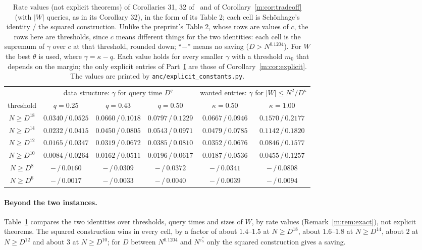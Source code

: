 \documentclass[11pt]{article}
\theoremstyle{definition}
\theoremstyle{remark}
\newcommand{\es}{\varepsilon^*_5}
\begin{document}
\begin{table}[t]
\centering\small
\setlength{\tabcolsep}{4pt}
\begin{tabular}{c|ccc|cc}
 & \multicolumn{3}{c|}{data structure: $\gamma$ for query time $D^{q}$} & \multicolumn{2}{c}{wanted entries: $\gamma$ for $|W|\le N^2/D^{\kappa}$}\\
threshold & $q=0.25$ & $q=0.43$ & $q=0.50$ & $\kappa=0.50$ & $\kappa=1.00$\\\hline
$N\ge D^{18}$ & $0.0340\,/\,0.0525$ & $0.0660\,/\,0.1018$ & $0.0797\,/\,0.1229$ & $0.0667\,/\,0.0946$ & $0.1570\,/\,0.2177$\\
$N\ge D^{14}$ & $0.0232\,/\,0.0415$ & $0.0450\,/\,0.0805$ & $0.0543\,/\,0.0971$ & $0.0479\,/\,0.0785$ & $0.1142\,/\,0.1820$\\
$N\ge D^{12}$ & $0.0165\,/\,0.0347$ & $0.0319\,/\,0.0672$ & $0.0385\,/\,0.0810$ & $0.0352\,/\,0.0676$ & $0.0846\,/\,0.1577$\\
$N\ge D^{10}$ & $0.0084\,/\,0.0264$ & $0.0162\,/\,0.0511$ & $0.0196\,/\,0.0617$ & $0.0187\,/\,0.0536$ & $0.0455\,/\,0.1257$\\
$N\ge D^{8}$ & $-\,/\,0.0160$ & $-\,/\,0.0309$ & $-\,/\,0.0372$ & $-\,/\,0.0341$ & $-\,/\,0.0808$\\
$N\ge D^{6}$ & $-\,/\,0.0017$ & $-\,/\,0.0033$ & $-\,/\,0.0040$ & $-\,/\,0.0039$ & $-\,/\,0.0094$
\end{tabular}
\caption{Rate values (not explicit theorems) of Corollaries 31, 32 of~\cite{ZT} and of Corollary~\ref{m:cor:tradeoff} (with $|W|$ queries, as in its Corollary 32), in the form of its Table 2; each cell is Schönhage's identity / the squared construction. Unlike the preprint's Table 2, whose rows are values of $c$, the rows here are thresholds, since $c$ means different things for the two identities: each cell is the supremum of $\gamma$ over $c$ at that threshold, rounded down; ``$-$'' means no saving ($D>N^{0.1204}$). For $W$ the best $\theta$ is used, where $\gamma=\kappa-q$. Each value holds for every smaller $\gamma$ with a threshold $m_0$ that depends on the margin; the only explicit entries of Part~\hyperref[m:partI]{I} are those of Corollary~\ref{m:cor:explicit}. The values are printed by \texttt{anc/explicit\_constants.py}.}
\label{m:tab:rates}
\end{table}

\paragraph{Beyond the two instances.} Table~\ref{m:tab:rates} compares the two identities over thresholds, query times and sizes of $W$, by rate values (Remark~\ref{m:rem:exact}), not explicit theorems. The squared construction wins in every cell, by a factor of about $1.4$--$1.5$ at $N\ge D^{18}$, about $1.6$--$1.8$ at $N\ge D^{14}$, about $2$ at $N\ge D^{12}$ and about $3$ at $N\ge D^{10}$; for $D$ between $N^{0.1204}$ and $N^{\es}$ only the squared construction gives a saving.
\end{document}
